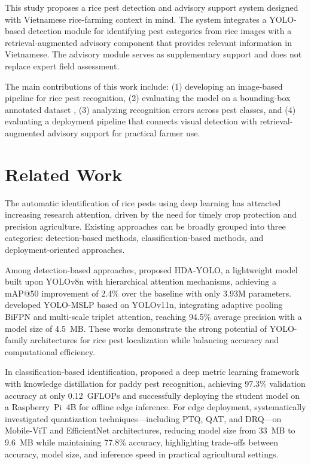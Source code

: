 ﻿\documentclass[11pt]{article}
\begin{document}
This study proposes a rice pest detection and advisory support system designed with Vietnamese rice-farming context in mind. The system integrates a YOLO-based detection module for identifying pest categories from rice images with a retrieval-augmented advisory component that provides relevant information in Vietnamese. The advisory module serves as supplementary support and does not replace expert field assessment.

The main contributions of this work include: (1) developing an image-based pipeline for rice pest recognition, (2) evaluating the model on a bounding-box annotated dataset \citep{quach2024rice}, (3) analyzing recognition errors across pest classes, and (4) evaluating a deployment pipeline that connects visual detection with retrieval-augmented advisory support for practical farmer use.

\section{Related Work}

The automatic identification of rice pests using deep learning has
attracted increasing research attention, driven by the need for timely
crop protection and precision agriculture. Existing approaches can be
broadly grouped into three categories: detection-based methods,
classification-based methods, and deployment-oriented approaches.

Among detection-based approaches, \cite{yuan2026hda} proposed
HDA-YOLO, a lightweight model built upon YOLOv8n with hierarchical
attention mechanisms, achieving a mAP@50 improvement of 2.4\% over
the baseline with only 3.93M parameters. \citet{li2025yolomslp}
developed YOLO-MSLP based on YOLOv11n, integrating adaptive pooling
BiFPN and multi-scale triplet attention, reaching 94.5\% average
precision with a model size of 4.5~MB. These works demonstrate the
strong potential of YOLO-family architectures for rice pest
localization while balancing accuracy and computational efficiency.

In classification-based identification, \citet{darmawan2024dml}
proposed a deep metric learning framework with knowledge distillation
for paddy pest recognition, achieving 97.3\% validation accuracy at
only 0.12~GFLOPs and successfully deploying the student model on a
Raspberry~Pi~4B for offline edge inference. For edge deployment,
\citet{akhtar2025edge} systematically investigated quantization
techniques---including PTQ, QAT, and DRQ---on Mobile-ViT and
EfficientNet architectures, reducing model size from 33~MB to 9.6~MB
while maintaining 77.8\% accuracy, highlighting trade-offs between
accuracy, model size, and inference speed in practical agricultural
settings.
\end{document}
